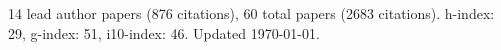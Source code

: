 14 lead author papers (876 citations),
60 total papers (2683 citations).\newline
h-index: 29, g-index: 51, i10-index: 46. Updated \today.